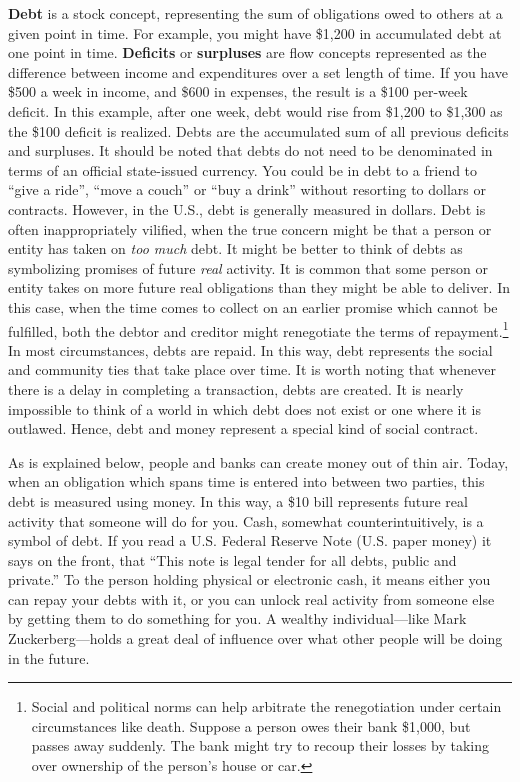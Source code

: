 \documentclass[
]{book}
\begin{document}
\textbf{Debt} is a stock concept, representing the sum of obligations owed to others at a given point in time. For example, you might have \$1,200 in accumulated debt at one point in time. \textbf{Deficits} or \textbf{surpluses} are flow concepts represented as the difference between income and expenditures over a set length of time. If you have \$500 a week in income, and \$600 in expenses, the result is a \$100 per-week deficit. In this example, after one week, debt would rise from \$1,200 to \$1,300 as the \$100 deficit is realized. Debts are the accumulated sum of all previous deficits and surpluses. It should be noted that debts do not need to be denominated in terms of an official state-issued currency. You could be in debt to a friend to ``give a ride'', ``move a couch'' or ``buy a drink'' without resorting to dollars or contracts. However, in the U.S., debt is generally measured in dollars. Debt is often inappropriately vilified, when the true concern might be that a person or entity has taken on \emph{too much} debt. It might be better to think of debts as symbolizing promises of future \emph{real} activity. It is common that some person or entity takes on more future real obligations than they might be able to deliver. In this case, when the time comes to collect on an earlier promise which cannot be fulfilled, both the debtor and creditor might renegotiate the terms of repayment.\footnote{Social and political norms can help arbitrate the renegotiation under certain circumstances like death. Suppose a person owes their bank \$1,000, but passes away suddenly. The bank might try to recoup their losses by taking over ownership of the person's house or car.} In most circumstances, debts are repaid. In this way, debt represents the social and community ties that take place over time. It is worth noting that whenever there is a delay in completing a transaction, debts are created. It is nearly impossible to think of a world in which debt does not exist or one where it is outlawed. Hence, debt and money represent a special kind of social contract.

As is explained below, people and banks can create money out of thin air. Today, when an obligation which spans time is entered into between two parties, this debt is measured using money. In this way, a \$10 bill represents future real activity that someone will do for you. Cash, somewhat counterintuitively, is a symbol of debt. If you read a U.S. Federal Reserve Note (U.S. paper money) it says on the front, that ``This note is legal tender for all debts, public and private.'' To the person holding physical or electronic cash, it means either you can repay your debts with it, or you can unlock real activity from someone else by getting them to do something for you. A wealthy individual---like Mark Zuckerberg---holds a great deal of influence over what other people will be doing in the future.
\end{document}
